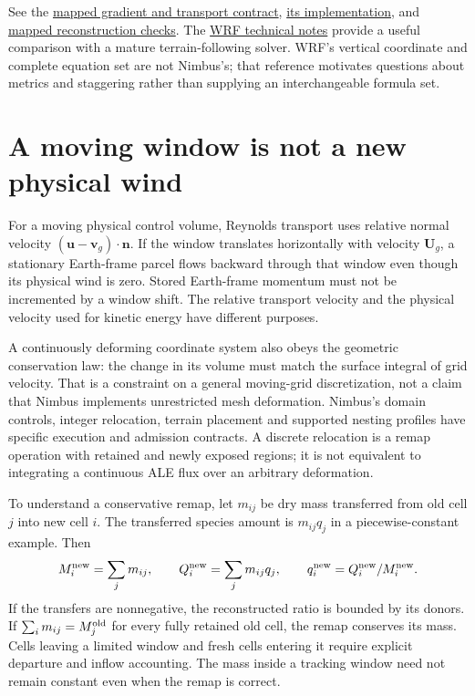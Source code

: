 See the \href{../include/terrain/conservative_transport.hpp}{mapped gradient
and transport contract},
\href{../src/terrain/base/conservative_transport.cpp}{its implementation}, and
\href{../tests/dynamics/test_mapped_reconstruction.cpp}{mapped reconstruction
checks}. The \href{https://www2.mmm.ucar.edu/wrf/site/documentation/technote.html}{WRF
technical notes} provide a useful comparison with a mature terrain-following
solver. WRF's vertical coordinate and complete equation set are not Nimbus's;
that reference motivates questions about metrics and staggering rather than
supplying an interchangeable formula set.

\section{A moving window is not a new physical wind}

For a moving physical control volume, Reynolds transport uses relative normal
velocity $(\boldsymbol u-\boldsymbol v_g)\cdot\boldsymbol n$. If the window
translates horizontally with velocity $\boldsymbol U_g$, a stationary Earth-frame
parcel flows backward through that window even though its physical wind is
zero. Stored Earth-frame momentum must not be incremented by a window shift.
The relative transport velocity and the physical velocity used for kinetic
energy have different purposes.

A continuously deforming coordinate system also obeys the geometric conservation
law: the change in its volume must match the surface integral of grid velocity.
That is a constraint on a general moving-grid discretization, not a claim that
Nimbus implements unrestricted mesh deformation. Nimbus's domain controls,
integer relocation, terrain placement and supported nesting profiles have
specific execution and admission contracts. A discrete relocation is a remap
operation with retained and newly exposed regions; it is not equivalent to
integrating a continuous ALE flux over an arbitrary deformation.

To understand a conservative remap, let $m_{ij}$ be dry mass transferred from old
cell $j$ into new cell $i$. The transferred species amount is $m_{ij}q_j$ in a
piecewise-constant example. Then
\[
 M_i^{\rm new}=\sum_jm_{ij},\qquad
 Q_i^{\rm new}=\sum_jm_{ij}q_j,\qquad
 q_i^{\rm new}=Q_i^{\rm new}/M_i^{\rm new}.
\]
If the transfers are nonnegative, the reconstructed ratio is bounded by its
donors. If $\sum_i m_{ij}=M_j^{\rm old}$ for every fully retained old cell,
the remap conserves its mass. Cells leaving a limited window and fresh cells
entering it require explicit departure and inflow accounting. The mass inside
a tracking window need not remain constant even when the remap is correct.

